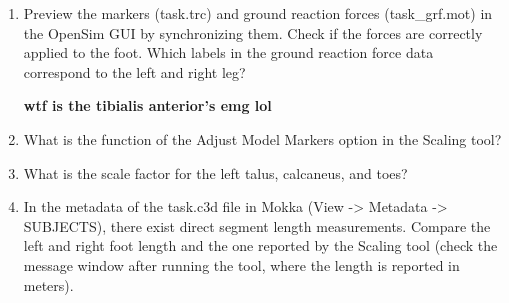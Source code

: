 \documentclass[11pt]{article}
\begin{document}
\begin{enumerate}
\begin{enumerate}
        \item How does the coordinate system of the experiment (lab) differ from the coordinate
        system in OpenSim?
        \begin{adjustwidth}{0.5cm}{}
            In OpenSim, the up direction corresponds to the $y$ axis, in the experiment, the $z$ axis points up.
        \end{adjustwidth}
        \item Visualize the ground reaction forces (Analog channels, then drag and drop the
        component into an analog type plot). What do you observe in terms of the quality of
        the signal?
        \begin{adjustwidth}{0.5cm}{}
            \begin{figure}[h!]
                \centering
                \texttt{[image: screens/ground\_reaction.png]}
                \caption{Ground reaction forces, as displayed in Mokka}
            \end{figure}
            The signal is somewhat noisy and only shows values when the patient is walking over the pressure plate.
        \end{adjustwidth}
        \item Calculate the linear envelop (Tools -> Analog -> Smooth / Linear Envelope) of the right
        tibialis anterior’s EMG. What is the linear envelop?
        \begin{adjustwidth}{0.5cm}{}
            \textbf{wtf is the tibialis anterior’s emg lol}
        \end{adjustwidth}
    \end{enumerate}
    \item Preview the markers (task.trc) and ground reaction forces (task\_grf.mot) in the OpenSim GUI
    by synchronizing them. Check if the forces are correctly applied to the foot. Which labels in the ground reaction force data correspond to the left and right leg?
    \begin{adjustwidth}{0.5cm}{}
        \textbf{wtf is the tibialis anterior’s emg lol}
    \end{adjustwidth}
    \item What is the function of the Adjust Model Markers option in the Scaling tool?
    \item What is the scale factor for the left talus, calcaneus, and toes?
    \item In the metadata of the task.c3d file in Mokka (View -> Metadata -> SUBJECTS), there exist direct segment length measurements. Compare the left and right foot length and the one reported by the Scaling tool (check the message window after running the tool, where the length is reported in meters).

\end{enumerate}
\end{document}
